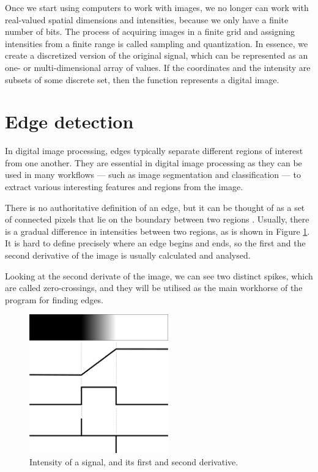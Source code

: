\documentclass[
  digital,     %
  oneside,     %
  nosansbold,  %
  nocolorbold, %
  lof,         %
  lot,         %
]{fithesis4}
\begin{document}
Once we start using computers to work with images, we no longer can work with
real-valued spatial dimensions and intensities, because we only have a finite
number of bits. The process of acquiring images in a finite grid and assigning
intensities from a finite range is called sampling and quantization. In essence,
we create a discretized version of the original signal, which can be represented
as an one- or multi-dimensional array of values. If the coordinates and the
intensity are subsets of some discrete set, then the function represents a
digital image.

\section{Edge detection}

In digital image processing, edges typically separate different regions of
interest from one another. They are essential in digital image processing
as they can be used in many workflows --- such as image segmentation and
classification --- to extract various interesting features and regions
from the image.

There is no authoritative definition of an edge, but it can be thought of as a
set of connected pixels that lie on the boundary between two regions
\cite{gonzalez2002}. Usually, there is a gradual difference in intensities
between two regions, as is shown in Figure \ref{fig:edge_intensities}. It is
hard to define precisely where an edge begins and ends, so the first and the
second derivative of the image is usually calculated and analysed.

Looking at the second derivate of the image, we can see two distinct spikes,
which are called zero-crossings, and they will be utilised as the main workhorse
of the program for finding edges.

\begin{figure}
    \begin{center}
        \includegraphics[width=6cm]{resources/inkscape/gradient.png}
    \end{center}
    \caption{Intensity of a signal, and its first and second derivative.}
    \label{fig:edge_intensities}
\end{figure}
\end{document}
